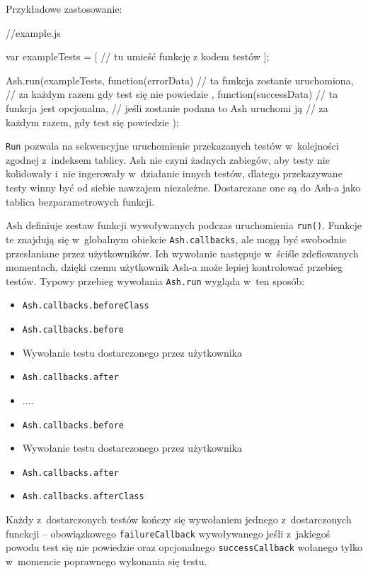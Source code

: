 \documentclass[brudnopis]{xmgr}
\begin{document}
Przykładowe zastosowanie: 

\begin{javascriptcode}
     //example.js

    var exampleTests = [
	//  tu umieść funkcję z kodem testów 
    ];

    Ash.run(exampleTests, function(errorData){
      // ta funkcja zostanie uruchomiona, 
      //   za każdym razem gdy test się nie powiedzie
    }, function(successData){
      // ta funkcja jest opcjonalna, 
      //   jeśli zostanie podana to Ash uruchomi ją 
      //   za każdym razem, gdy test się powiedzie
    });
\end{javascriptcode}

\texttt{Run} pozwala na sekwencyjne uruchomienie przekazanych testów w~kolejności zgodnej z~indeksem tablicy. Ash nie czyni żadnych zabiegów, aby testy nie kolidowały i~nie ingerowały w~działanie innych testów, dlatego przekazywane testy winny być od siebie nawzajem niezależne. Dostarczane one są do Ash-a jako tablica bezparametrowych funkcji.

Ash definiuje zestaw funkcji wywoływanych podczas uruchomienia \texttt{run()}. Funkcje te znajdują się w~globalnym obiekcie \texttt{Ash.callbacks}, ale mogą być swobodnie przesłaniane przez użytkowników. Ich wywołanie następuje w~ściśle zdefiowanych momentach, dzięki czemu użytkownik Ash-a może lepiej kontrolować przebieg testów. Typowy przebieg wywołania \texttt{Ash.run} wygląda w~ten sposób:

\begin{itemize}
  \item \texttt{Ash.callbacks.beforeClass}
  \item \texttt{Ash.callbacks.before}
  \item Wywołanie testu dostarczonego przez użytkownika
  \item \texttt{Ash.callbacks.after}
  \item ....
  \item \texttt{Ash.callbacks.before}
  \item Wywołanie testu dostarczonego przez użytkownika
  \item \texttt{Ash.callbacks.after}
  \item \texttt{Ash.callbacks.afterClass}
\end{itemize}

Każdy z~dostarczonych testów kończy się wywołaniem jednego z~dostarczonych funckcji -- obowiązkowego \texttt{failureCallback} wywoływanego jeśli z~jakiegoś powodu test się nie powiedzie oraz opcjonalnego \texttt{successCallback} wołanego tylko w~momencie poprawnego wykonania się testu.
\end{document}
